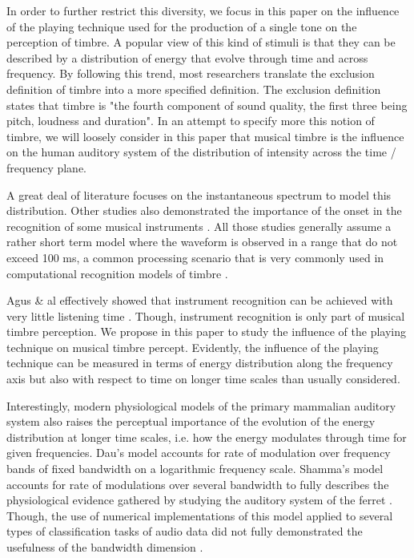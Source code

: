 \documentclass{article}
\makeatletter
\newcommand*{\ie}{i.e.\@\xspace}
\makeatother
\begin{document}
In order to further restrict this diversity, we focus in this paper on the influence of the playing technique used for the production of a single tone on the perception of timbre. A popular view of this kind of stimuli is that they can be described by a distribution of energy that evolve through time and across frequency. By following this trend, most researchers translate the exclusion definition of timbre \cite{marozeau2003dependency} into a more specified definition. The exclusion definition states that timbre is "the fourth component of sound quality, the first three being pitch, loudness and duration". In an attempt to specify more this notion of timbre, we will loosely consider in this paper that musical timbre is the influence on the human auditory system of the distribution of intensity across the time / frequency plane.

A great deal of literature focuses on the instantaneous spectrum \cite{grey1978perceptual} to model this distribution. Other studies also demonstrated the importance of the onset in the recognition of some musical instruments \cite{eronen2001comparison}. All those studies generally assume a rather short term model where the waveform is observed in a range that do not exceed 100 ms, a common processing scenario that is very commonly used in computational recognition models of timbre \cite{tzanetakis2002musical}.

Agus \& al effectively showed that instrument recognition can be achieved with very little listening time \cite{agus2012fast}. Though, instrument recognition is only part of musical timbre perception. We propose in this paper to study the influence of the playing technique on musical timbre percept. Evidently, the influence of the playing technique can be measured in terms of energy distribution along the frequency axis but also with respect to time on longer time scales than usually considered.

Interestingly, modern physiological models of the primary mammalian auditory system also raises the perceptual importance of the evolution of the energy distribution at longer time scales, \ie{} how the energy modulates through time for given frequencies.  Dau's model accounts for  rate of modulation over frequency bands of fixed bandwidth on a logarithmic frequency scale\cite{dau1997modeling}. Shamma's model accounts for rate  of modulations over several bandwidth to fully describes the physiological evidence gathered by studying the auditory system of the ferret \cite{yang1992auditory}. Though, the use of numerical implementations of this model applied to several types of classification tasks of audio data did not fully demonstrated the usefulness of the bandwidth dimension \cite{mesgarani2006discrimination}.
\end{document}
